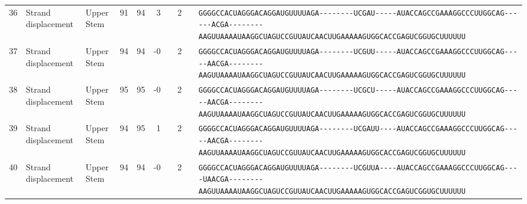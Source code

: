 \begin{tabular}{rllrrrrrcl}
 36 & Strand displacement & Upper Stem & 91 & 94 & 3 &  & 2 &  &
 \color{ucsfdarkgrey}\verb|GGGGCCACUAGGGACAGGAU|\color{ucsforange}\verb|GUUUUA|\color{ucsfblue}\verb|GA--------UCGAU-----|\color{ucsfpurple}\verb|AUACCAGCCGAAAGGCCCUUGGCAG|\color{ucsfblue}\verb|------ACGA--------AAGU|\color{ucsforange}\verb|UAAAAUAA|\color{ucsfnavy}\verb|GGCUAGUCC|\color{ucsforange}\verb|GUUAUCA|\color{ucsfteal}\verb|ACUUGAAAAAGU|\color{ucsforange}\verb|GGCACCGAGUCGGUGCUUUUUU| \\

 37 & Strand displacement & Upper Stem & 94 & 94 & -0 &  & 2 &  &
 \color{ucsfdarkgrey}\verb|GGGGCCACUAGGGACAGGAU|\color{ucsforange}\verb|GUUUUA|\color{ucsfblue}\verb|GA--------UCGUU-----|\color{ucsfpurple}\verb|AUACCAGCCGAAAGGCCCUUGGCAG|\color{ucsfblue}\verb|-----AACGA--------AAGU|\color{ucsforange}\verb|UAAAAUAA|\color{ucsfnavy}\verb|GGCUAGUCC|\color{ucsforange}\verb|GUUAUCA|\color{ucsfteal}\verb|ACUUGAAAAAGU|\color{ucsforange}\verb|GGCACCGAGUCGGUGCUUUUUU| \\

 38 & Strand displacement & Upper Stem & 95 & 95 & -0 &  & 2 &  &
 \color{ucsfdarkgrey}\verb|GGGGCCACUAGGGACAGGAU|\color{ucsforange}\verb|GUUUUA|\color{ucsfblue}\verb|GA--------UCGCU-----|\color{ucsfpurple}\verb|AUACCAGCCGAAAGGCCCUUGGCAG|\color{ucsfblue}\verb|-----AACGA--------AAGU|\color{ucsforange}\verb|UAAAAUAA|\color{ucsfnavy}\verb|GGCUAGUCC|\color{ucsforange}\verb|GUUAUCA|\color{ucsfteal}\verb|ACUUGAAAAAGU|\color{ucsforange}\verb|GGCACCGAGUCGGUGCUUUUUU| \\

 39 & Strand displacement & Upper Stem & 94 & 95 & 1 &  & 2 &  &
 \color{ucsfdarkgrey}\verb|GGGGCCACUAGGGACAGGAU|\color{ucsforange}\verb|GUUUUA|\color{ucsfblue}\verb|GA--------UCGAUU----|\color{ucsfpurple}\verb|AUACCAGCCGAAAGGCCCUUGGCAG|\color{ucsfblue}\verb|-----AACGA--------AAGU|\color{ucsforange}\verb|UAAAAUAA|\color{ucsfnavy}\verb|GGCUAGUCC|\color{ucsforange}\verb|GUUAUCA|\color{ucsfteal}\verb|ACUUGAAAAAGU|\color{ucsforange}\verb|GGCACCGAGUCGGUGCUUUUUU| \\

 40 & Strand displacement & Upper Stem & 94 & 94 & -0 &  & 2 &  &
 \color{ucsfdarkgrey}\verb|GGGGCCACUAGGGACAGGAU|\color{ucsforange}\verb|GUUUUA|\color{ucsfblue}\verb|GA--------UCGUUA----|\color{ucsfpurple}\verb|AUACCAGCCGAAAGGCCCUUGGCAG|\color{ucsfblue}\verb|----UAACGA--------AAGU|\color{ucsforange}\verb|UAAAAUAA|\color{ucsfnavy}\verb|GGCUAGUCC|\color{ucsforange}\verb|GUUAUCA|\color{ucsfteal}\verb|ACUUGAAAAAGU|\color{ucsforange}\verb|GGCACCGAGUCGGUGCUUUUUU| \\


\end{tabular}
